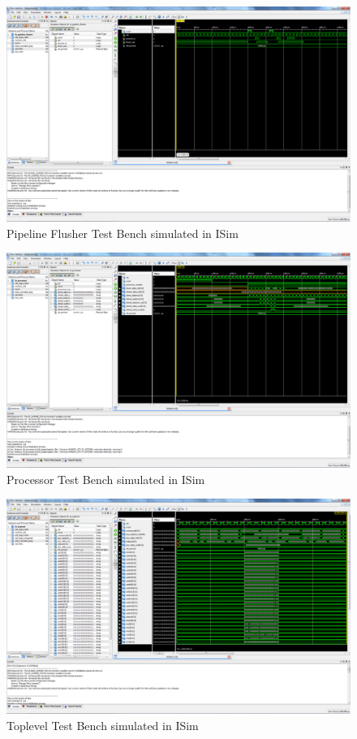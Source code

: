 \begin{figure}
    \includegraphics[width=\textwidth]{illustrations/tb_pipeline_flusher.PNG}
    \caption{Pipeline Flusher Test Bench simulated in ISim}
\end{figure}

\begin{figure}
    \includegraphics[width=\textwidth]{illustrations/tb_processor.PNG}
    \caption{Processor Test Bench simulated in ISim}
\end{figure}

\begin{figure}
    \includegraphics[width=\textwidth]{illustrations/tb_toplevel.PNG}
    \caption{Toplevel Test Bench simulated in ISim}
\end{figure}

